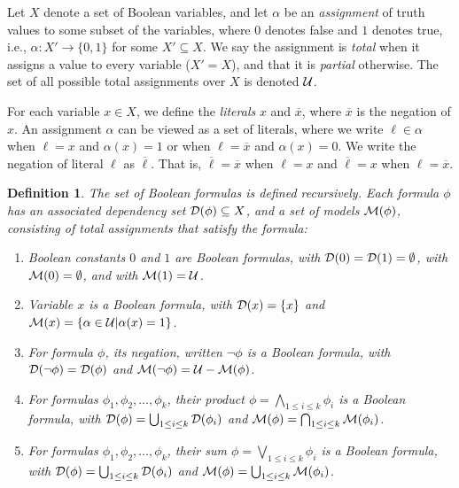 \documentclass[twoside,11pt]{article}
\newcommand{\boolnot}{\neg}
\newcommand{\obar}[1]{\overline{#1}}
\newcommand{\lit}{\ell}
\newcommand{\varset}{X}
\newcommand{\dependencyset}{{\cal D}}
\newcommand{\assign}{\alpha}
\newcommand{\uassign}{{\cal U}}
\newcommand{\modelset}{{\cal M}}
\newtheorem{dfn}{Definition}
\begin{document}
  Let $\varset$ denote a set of Boolean variables, and let $\assign$
  be an \emph{assignment} of truth values to some subset of the
  variables, where $0$ denotes false and $1$ denotes true, i.e.,
  $\assign \colon \varset' \rightarrow \{0,1\}$ for some $\varset'
  \subseteq \varset$.  We say the assignment is \emph{total} when it
  assigns a value to every variable ($\varset' = \varset$), and that
  it is \emph{partial} otherwise.
  The set of all possible total assignments over
  $\varset$ is denoted $\uassign$.

For each variable $x \in \varset$,
  we define the \emph{literals} $x$ and $\obar{x}$, where $\obar{x}$ is the
  negation of $x$. An
  assignment $\assign$ can be viewed as a set of literals, where
  we write $\lit \in \assign$ when $\lit = x$ and $\assign(x) = 1$ or when
  $\lit = \obar{x}$ and $\assign(x) = 0$.  We write the negation of literal $\lit$ as $\obar{\lit}$.  That is, $\obar{\lit} = \obar{x}$ when $\lit = x$ and
$\obar{\lit} = x$ when $\lit = \obar{x}$.


\begin{dfn}
  The set of Boolean formulas is defined recursively.  Each
  formula $\phi$ has an associated \emph{dependency set}
  $\dependencyset(\phi)  \subseteq \varset$, and a set of \emph{models} $\modelset(\phi)$,
  consisting of total assignments that satisfy the formula:
  \begin{enumerate}
  \item Boolean constants $0$ and $1$ are Boolean formulas,
    with $\dependencyset(0) = \dependencyset(1) = \emptyset$, with $\modelset(0) = \emptyset$, and with $\modelset(1) = \uassign$.
  \item Variable $x$ is a Boolean formula, with $\dependencyset(x) = \{x\}$
    and $\modelset(x) = \{\assign \in \uassign | \assign(x)=1\}$.
  \item For formula $\phi$, its \emph{negation}, written $\boolnot \phi$ is a Boolean formula,
    with $\dependencyset(\boolnot \phi) = \dependencyset(\phi)$ and $\modelset(\boolnot \phi) = \uassign - \modelset(\phi)$.
  \item For formulas $\phi_1, \phi_2, \ldots, \phi_k$, their \emph{product} $\phi = \bigwedge_{1 \leq i \leq k} \phi_i$ is a Boolean formula, with
      $\dependencyset(\phi) = \bigcup_{1 \leq i \leq k} \dependencyset(\phi_i)$ and
      $\modelset(\phi) = \bigcap_{1 \leq i \leq k} \modelset(\phi_i)$.
  \item For formulas $\phi_1, \phi_2, \ldots, \phi_k$, their \emph{sum} $\phi = \bigvee_{1 \leq i \leq k} \phi_i$ is a Boolean formula, with
      $\dependencyset(\phi) = \bigcup_{1 \leq i \leq k} \dependencyset(\phi_i)$ and
      $\modelset(\phi) = \bigcup_{1 \leq i \leq k} \modelset(\phi_i)$.
  \end{enumerate}
\label{def:boolean}
\end{dfn}
\end{document}
